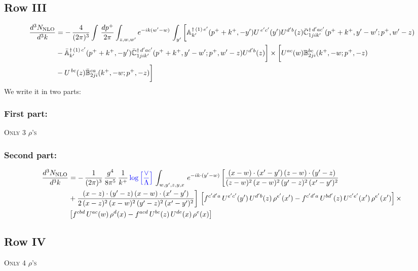 \documentclass[9pt]{article}
\def\mf#1{\mathbb{#1}}
\numberwithin{equation}{section}
\begin{document}
 \subsection{Row III}
 \begin{align}
    \frac{d^{3}N_{\rm NLO}}{d^{3}k} & =   -\,\frac{4}{(2\pi)^{3}} \int\, \frac{dp^{+}}{2\pi}\int_{z,w,w^{\prime}} e^{-ik(w^{\prime}-w)}\,\int_{y^{\prime}}\bigg[\mf{A}^{\dagger\, (1)\,e^{\prime}}_{k^{\prime}}(p^{+}+k^{+},-y^{\prime})U^{\, e^{\prime}c^{\prime}}(y^{\prime})U^{d^{\prime}b}(z) \Bar{\mf{C}}^{\dagger\, d^{\prime}ac^{\prime}}_{1jik^{\prime}}(p^{+}+k^{+},y^{\prime}-w^{\prime}; p^{+},w^{\prime}-z)\notag \\ &  -\Bar{\mf{A}}^{\dagger\, (1)\,c^{\prime}}_{k^{\prime}}(p^{+}+k^{+},-y^{\prime}) \Bar{\mf{C}}^{\dagger\, d^{\prime}ac^{\prime}}_{1jik^{\prime}}(p^{+}+k^{+},y^{\prime}-w^{\prime}; p^{+},w^{\prime}-z)U^{d^{\prime}b}(z)\bigg] \times \bigg[U^{ac}(w) \mf{B}^{bc}_{2ji}(k^{+},-w;p^{+},-z)\notag \\ &  -U^{\, bc}(z)\Bar{\mf{B}}^{ca}_{2ji}(k^{+},-w; p^{+},-z)\bigg]\nonumber
\end{align}
We write it in two parts:
\subsubsection{First part:}
\textsc{Only 3 $\rho$'s}
\subsubsection{Second part:}
\begin{align}
 \frac{d^{3}N_{\rm NLO}}{d^{3}k} & =  -\, \frac{1}{(2\pi)^{3}}\,\frac{g^{4}}{8\pi^{5}}\,\frac{1}{k^{+}}\,{\color{blue}\log{\left[\frac{\vee}{\Lambda}\right]}}\,\int_{w,y',z,y,x}\, e^{-ik\cdot (y'-w)}\,\bigg[\frac{(x-w)\cdot (x'-y')\,(z-w)\cdot (y'-z)}{(z-w)^{2}\,(x-w)^{2}\,(y'-z)^{2}\,(x'-y')^{2}}\notag \\ & +\frac{(x-z)\cdot (y'-z)\,(x-w)\cdot (x'-y')}{2\,(x-z)^{2}\,(x-w)^{2}\,(y'-z)^{2}\,(x'-y')^{2}}\bigg]\, \left[f^{c'd'a}\,U^{e'c'}(y')\,U^{d'b}(z)\,\rho^{e'}(x')-f^{c'd'a}\, 
    U^{bd'}(z)\,U^{c'e'}(x')\,\rho^{e'}(x')\right]\times\notag \\ &  \left[f^{cbd}\,U^{ac}(w)\,\rho^{d}(x) -f^{acd}\,U^{bc}(z)\,U^{de}(x)\,\rho^{e}(x)\right] 
\end{align}
\subsection{Row IV}
\textsc{Only 4 $\rho$'s}
\end{document}
